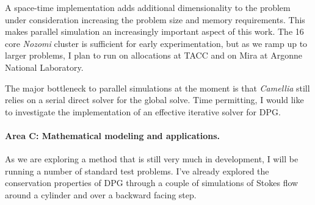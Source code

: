\documentclass[letterpaper]{article}
\begin{document}
A space-time implementation adds additional dimensionality to the problem under consideration increasing the problem size and memory requirements.
This makes parallel simulation an increasingly important aspect of this work.
The 16 core \emph{Nozomi} cluster is sufficient for early experimentation, but as we ramp up to larger problems, I plan to run on allocations at TACC and on Mira at Argonne National Laboratory.

The major bottleneck to parallel simulations at the moment is that \emph{Camellia} still relies on a serial direct solver for the global solve.
Time permitting, I would like to investigate the implementation of an effective iterative solver for DPG.



\paragraph{Area C: Mathematical modeling and applications.}
As we are exploring a method that is still very much in development, I will be running a number of standard test problems.
I've already explored the conservation properties of DPG through a couple of simulations of Stokes flow around a cylinder and over
a backward facing step.
\end{document}
